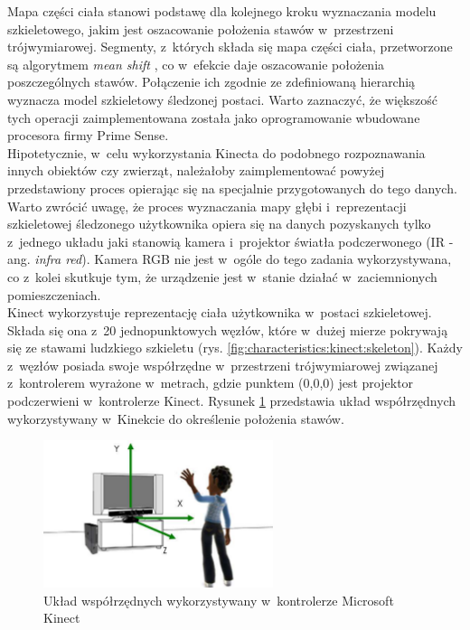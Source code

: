 Mapa części ciała stanowi podstawę dla kolejnego kroku wyznaczania modelu szkieletowego, jakim jest oszacowanie położenia stawów w~przestrzeni trójwymiarowej. Segmenty, z~których składa się mapa części ciała, przetworzone są algorytmem \emph{mean shift} \cite{Comaniciu2003}, co w~efekcie daje oszacowanie położenia poszczególnych stawów. Połączenie ich zgodnie ze zdefiniowaną hierarchią wyznacza model szkieletowy śledzonej postaci. Warto zaznaczyć, że większość tych operacji zaimplementowana została jako oprogramowanie wbudowane procesora firmy Prime Sense.\\
Hipotetycznie, w~celu wykorzystania Kinecta do podobnego rozpoznawania innych obiektów czy zwierząt, należałoby zaimplementować powyżej przedstawiony proces opierając się na specjalnie przygotowanych do tego danych.
Warto zwrócić uwagę, że proces wyznaczania mapy głębi i~reprezentacji szkieletowej śledzonego użytkownika opiera się na danych pozyskanych tylko z~jednego układu jaki stanowią kamera i~projektor światła podczerwonego (IR - ang. \textit{infra red}). Kamera RGB nie jest w~ogóle do tego zadania wykorzystywana, co z~kolei skutkuje tym, że urządzenie jest w~stanie działać w~zaciemnionych pomieszczeniach.\\
																									
Kinect wykorzystuje reprezentację ciała użytkownika w~postaci szkieletowej. Składa się ona z~20 jednopunktowych węzłów, które w~dużej mierze pokrywają się ze stawami ludzkiego szkieletu (rys. \ref{fig:characteristics:kinect:skeleton}). Każdy z~węzłów posiada swoje współrzędne w~przestrzeni trójwymiarowej związanej z~kontrolerem wyrażone w~metrach, gdzie punktem (0,0,0) jest projektor podczerwieni w~kontrolerze Kinect. Rysunek \ref{fig:characteristics:kinect:space} przedstawia układ współrzędnych wykorzystywany w~Kinekcie do określenie położenia stawów. 
																									
\begin{savenotes}
	\begin{figure}
		\centering
		\includegraphics[width=0.6\textwidth]{images/skeletonSpace.png}
		\caption[Układ współrzędnych wykorzystywany w~kontrolerze Microsoft Kinect]{Układ współrzędnych wykorzystywany w~kontrolerze Microsoft Kinect }
		\label{fig:characteristics:kinect:space}
	\end{figure}
\end{savenotes}
																											
